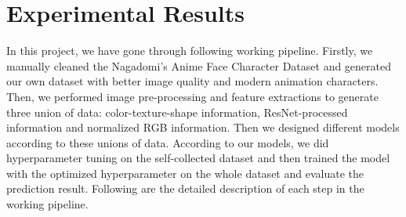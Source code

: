 \documentclass[11.5pt]{article}
\begin{document}
    \section{Experimental Results}
    In this project, we have gone through following working pipeline.
    Firstly, we manually cleaned the Nagadomi's Anime Face Character Dataset and generated our own dataset with better image quality and modern animation characters.
    Then, we performed image pre-processing and feature extractions to generate three union of data: color-texture-shape information, ResNet-processed information and normalized RGB information.
    Then we designed different models according to these unions of data.
    According to our models, we did hyperparameter tuning on the self-collected dataset and then trained the model with the optimized hyperparameter on the whole dataset and evaluate the prediction result.
    Following are the detailed description of each step in the working pipeline.
\end{document}
